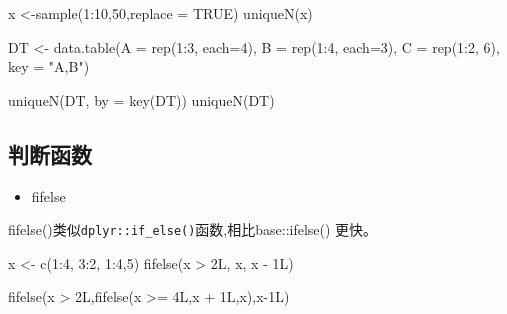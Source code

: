 \documentclass[
]{book}
\newenvironment{Shaded}{\begin{snugshade}}{\end{snugshade}}
\newcommand{\AttributeTok}[1]{\textcolor[rgb]{0.77,0.63,0.00}{#1}}
\newcommand{\ConstantTok}[1]{\textcolor[rgb]{0.00,0.00,0.00}{#1}}
\newcommand{\DecValTok}[1]{\textcolor[rgb]{0.00,0.00,0.81}{#1}}
\newcommand{\FunctionTok}[1]{\textcolor[rgb]{0.00,0.00,0.00}{#1}}
\newcommand{\NormalTok}[1]{#1}
\newcommand{\OtherTok}[1]{\textcolor[rgb]{0.56,0.35,0.01}{#1}}
\newcommand{\SpecialCharTok}[1]{\textcolor[rgb]{0.00,0.00,0.00}{#1}}
\newcommand{\StringTok}[1]{\textcolor[rgb]{0.31,0.60,0.02}{#1}}
\providecommand{\tightlist}{%
  \setlength{\itemsep}{0pt}\setlength{\parskip}{0pt}}
\begin{document}
\begin{Shaded}
\begin{Highlighting}[]
\NormalTok{x }\OtherTok{\textless{}{-}}\FunctionTok{sample}\NormalTok{(}\DecValTok{1}\SpecialCharTok{:}\DecValTok{10}\NormalTok{,}\DecValTok{50}\NormalTok{,}\AttributeTok{replace =} \ConstantTok{TRUE}\NormalTok{)}
\FunctionTok{uniqueN}\NormalTok{(x)}

\NormalTok{DT }\OtherTok{\textless{}{-}} \FunctionTok{data.table}\NormalTok{(}\AttributeTok{A =} \FunctionTok{rep}\NormalTok{(}\DecValTok{1}\SpecialCharTok{:}\DecValTok{3}\NormalTok{, }\AttributeTok{each=}\DecValTok{4}\NormalTok{), }\AttributeTok{B =} \FunctionTok{rep}\NormalTok{(}\DecValTok{1}\SpecialCharTok{:}\DecValTok{4}\NormalTok{, }\AttributeTok{each=}\DecValTok{3}\NormalTok{),}
                 \AttributeTok{C =} \FunctionTok{rep}\NormalTok{(}\DecValTok{1}\SpecialCharTok{:}\DecValTok{2}\NormalTok{, }\DecValTok{6}\NormalTok{), }\AttributeTok{key =} \StringTok{"A,B"}\NormalTok{)}

\FunctionTok{uniqueN}\NormalTok{(DT, }\AttributeTok{by =} \FunctionTok{key}\NormalTok{(DT))}
\FunctionTok{uniqueN}\NormalTok{(DT)}
\end{Highlighting}
\end{Shaded}

\hypertarget{ux5224ux65adux51fdux6570}{%
\subsection{判断函数}\label{ux5224ux65adux51fdux6570}}

\begin{itemize}
\tightlist
\item
  fifelse
\end{itemize}

fifelse()类似\texttt{dplyr::if\_else()}函数,相比base::ifelse() 更快。

\begin{Shaded}
\begin{Highlighting}[]
\NormalTok{x }\OtherTok{\textless{}{-}}  \FunctionTok{c}\NormalTok{(}\DecValTok{1}\SpecialCharTok{:}\DecValTok{4}\NormalTok{, }\DecValTok{3}\SpecialCharTok{:}\DecValTok{2}\NormalTok{, }\DecValTok{1}\SpecialCharTok{:}\DecValTok{4}\NormalTok{,}\DecValTok{5}\NormalTok{)}
\FunctionTok{fifelse}\NormalTok{(x }\SpecialCharTok{\textgreater{}}\NormalTok{ 2L, x, x }\SpecialCharTok{{-}}\NormalTok{ 1L)}

\FunctionTok{fifelse}\NormalTok{(x }\SpecialCharTok{\textgreater{}}\NormalTok{ 2L,}\FunctionTok{fifelse}\NormalTok{(x }\SpecialCharTok{\textgreater{}=}\NormalTok{ 4L,x }\SpecialCharTok{+}\NormalTok{ 1L,x),x}\SpecialCharTok{{-}}\NormalTok{1L)}
\end{Highlighting}
\end{Shaded}
\end{document}
